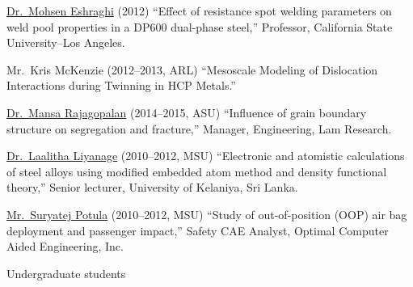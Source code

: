 \begin{list2}
\item
\href{http://scholar.google.com/citations?user=-Wia-SkAAAAJ&hl=en}{Dr.~Mohsen Eshraghi} (2012) ``Effect of resistance spot welding parameters on weld pool properties in a DP600 dual-phase steel,''  Professor, California State University--Los Angeles.
\item
Mr.~Kris McKenzie (2012--2013, ARL) ``Mesoscale Modeling of Dislocation Interactions during Twinning in HCP Metals.'' 
\item
\href{https://scholar.google.com/citations?view_op=list_works&hl=en&hl=en&user=J1DJ_3YAAAAJ}{Dr.~Mansa Rajagopalan} (2014--2015, ASU) ``Influence of grain boundary structure on segregation and fracture,'' Manager, Engineering, Lam Research. 
\item
\href{http://scholar.google.com/citations?user=u0b0HCUAAAAJ&hl=en}{Dr.~Laalitha Liyanage} (2010--2012, MSU) ``Electronic and atomistic calculations of steel alloys using modified embedded atom method and density functional theory,'' Senior lecturer, University of Kelaniya, Sri Lanka.
\item
\href{http://scholar.google.com/citations?user=8YpvYScAAAAJ&hl=en}{Mr.~Suryatej Potula} (2010--2012, MSU) ``{Study of out-of-position (OOP) air bag deployment and passenger impact},'' Safety CAE Analyst, Optimal Computer Aided Engineering, Inc.

\end{list2}

Undergraduate students

